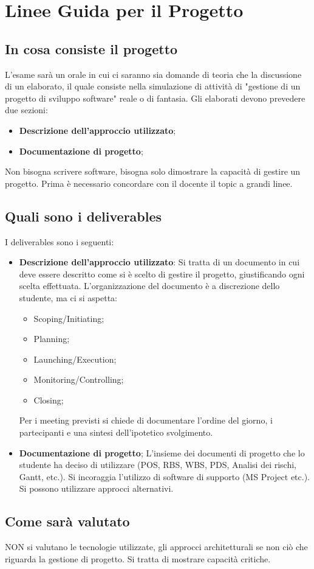 \section{Linee Guida per il Progetto}
\subsection{In cosa consiste il progetto}
L'esame sarà un orale in cui ci saranno sia domande di teoria che la discussione di un elaborato, il quale consiste nella simulazione di attività di "gestione di un progetto di sviluppo software" reale o di fantasia.\newline
Gli elaborati devono prevedere due sezioni:
\begin{itemize}
	\item \textbf{Descrizione dell'approccio utilizzato};
	\item \textbf{Documentazione di progetto};
\end{itemize}
Non bisogna scrivere software, bisogna solo dimostrare la capacità di gestire un progetto. Prima è necessario concordare con il docente il topic a grandi linee.
\subsection{Quali sono i deliverables}
I deliverables sono i seguenti:
\begin{itemize}
	\item \textbf{Descrizione dell'approccio utilizzato}: Si tratta di un documento in cui deve essere descritto come si è scelto di gestire il progetto, giustificando ogni scelta effettuata. L'organizzazione del documento è a discrezione dello studente, ma ci si aspetta:
	\begin{itemize}
		\item Scoping/Initiating;
		\item Planning;
		\item Launching/Execution;
		\item Monitoring/Controlling;
		\item Closing;
	\end{itemize}
	Per i meeting previsti si chiede di documentare l'ordine del giorno, i partecipanti e una sintesi dell'ipotetico svolgimento.
	\item \textbf{Documentazione di progetto}; L'insieme dei documenti di progetto che lo studente ha deciso di utilizzare (POS, RBS, WBS, PDS, Analisi dei rischi, Gantt, etc.).\newline
	Si incoraggia l'utilizzo di software di supporto (MS Project etc.). Si possono utilizzare approcci alternativi.
\end{itemize}
\subsection{Come sarà valutato}
NON si valutano le tecnologie utilizzate, gli approcci architetturali se non ciò che riguarda la gestione di progetto. Si tratta di mostrare capacità critiche.
